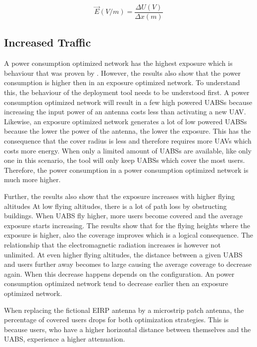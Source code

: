 \documentclass[twocolumn]{phdsymp} %
\begin{document}
\begin{equation}
\vec{E} (V/m) = \frac{\Delta U (V) }{\Delta x (m)}
\label{eq:exposureBasicFormula}
\end{equation}

\subsection{Increased Traffic}

A power consumption optimized network has the highest exposure which is behaviour that was proven by \cite{J1}. However, the results 
also show that the power consumption is higher then in an exposure optimized network. To understand this, the behaviour of the deployment tool needs to be understood first. 
A power consumption optimized network will result in a few high powered \gls{UABS}s because increasing the input power of an antenna costs 
less than activating a new  \gls{UAV}. Likewise, an exposure optimized network 
generates a lot of low powered \gls{UABS}s because the lower the power of the antenna, the lower the exposure. This has the consequence that the cover radius 
is less and therefore requires more \gls{UAV}s which costs more energy.
When only a limited amount of \gls{UABS}s are available, 
like only one in this scenario, the tool will only keep \gls{UABS}s which cover the most users. 
Therefore, the power consumption in a power consumption optimized network is much more higher. 

Further, the results also show that the exposure increases with higher flying altitudes At low flying altitudes, there is a lot of path loss by obstructing buildings. When 
\gls{UABS} fly higher, more users become covered and the average exposure starts increasing. 
The results show that for the flying heights where the exposure is higher, also the coverage improves which is 
a logical consequence. 
The relationship that the electromagnetic radiation increases is however not unlimited.
At even higher
flying altitudes, the distance between a given \gls{UABS} and users further away becomes to large causing the average 
coverage to decrease again. When this decrease happens depends on the configuration. An power consumption optimized 
network tend to decrease earlier then an exposure optimized network.

When replacing the fictional \gls{EIRP} antenna by a microstrip patch antenna, the percentage of covered users drops for both 
optimization strategies. This is because users, who have a higher horizontal distance between themselves and the \gls{UABS}, 
experience a higher attenuation.
\end{document}
